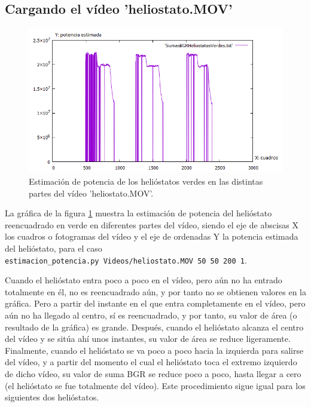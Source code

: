 \subsection{Cargando el vídeo 'heliostato.MOV'}

\begin{figure}[h!]
  	\centering
	\includegraphics[width=\textwidth]{ValidacionCualitativaFuncionEstimacionPotencia/SumasBGRHeliostatosVerdesVideo2.png}
	\caption{Estimación de potencia de los helióstatos verdes en las distintas partes del vídeo 'heliostato.MOV'.
	\label{fig:ValidacionCualitativaFuncionEstimacionPotencia/SumasBGRHeliostatosVerdesVideo2.png}}
\end{figure}

La gráfica de la figura \ref{fig:ValidacionCualitativaFuncionEstimacionPotencia/SumasBGRHeliostatosVerdesVideo2.png} muestra la estimación de potencia del helióstato reencuadrado en verde en diferentes partes del vídeo, siendo el eje de abscisas X los cuadros o fotogramas del vídeo y el eje de ordenadas Y la potencia estimada del helióstato, para el caso\\ \verb|estimacion_potencia.py Videos/heliostato.MOV 50 50 200 1|.

Cuando el helióstato entra poco a poco en el vídeo, pero aún no ha entrado totalmente en él, no es reencuadrado aún, y por tanto no se obtienen valores en la gráfica. Pero a partir del instante en el que entra completamente en el vídeo, pero aún no ha llegado al centro, sí es reencuadrado, y por tanto, su valor de área (o resultado de la gráfica) es grande. Después, cuando el helióstato alcanza el centro del vídeo y se sitúa ahí unos instantes, su valor de área se reduce ligeramente. Finalmente, cuando el helióstato se va poco a poco hacia la izquierda para salirse del vídeo, y a partir del momento el cual el helióstato toca el extremo izquierdo de dicho vídeo, su valor de suma BGR se reduce poco a poco, hasta llegar a cero (el helióstato se fue totalmente del vídeo). Este procedimiento sigue igual para los siguientes dos helióstatos.

